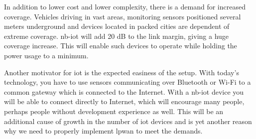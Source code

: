\documentclass[USenglish]{ifimaster}  %
\begin{document}
\begin{table}[H]
\centering
{}
\caption[Cost comparison]{Cost comparison between \acrshort{nb-iot} and \acrshort{lte} with of 300 devices.}
\label{equation:ltevslwpa}
\end{table}

In addition to lower cost and lower complexity, there is a demand for increased coverage. Vehicles driving in vast areas, monitoring sensors positioned several meters underground and devices located in packed cities are dependent of extreme coverage. \acrshort{nb-iot} will add 20 dB to the link margin, giving a huge coverage increase. This will enable such devices to operate while holding the power usage to a minimum.

Another motivator for \acrshort{iot} is the expected easiness of the setup. With today's technology, you have to use sensors communicating over Bluetooth or Wi-Fi to a common gateway which is connected to the Internet. With a \acrshort{nb-iot} device you will be able to connect directly to Internet, which will encourage many people, perhaps people without development experience as well. This will be an additional cause of growth in the number of \acrshort{iot} devices and is yet another reason why we need to properly implement \acrshort{lpwan} to meet the demands.
\end{document}
